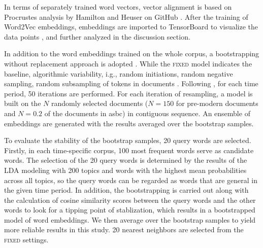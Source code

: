 In terms of separately trained word vectors, vector alignment is based on Procrustes analysis by Hamilton and Heuser on GitHub \parencite{hamilton2016law}. After the training of Word2Vec embeddings, embeddings are imported to TensorBoard to visualize the data points \parencite{smilkov2016projector}, and further analyzed in the discussion section.

In addition to the word embeddings trained on the whole corpus, a bootstrapping without replacement approach is adopted \parencite{antoniak2018evaluating}. While the \textsc{fixed} model indicates the baseline, algorithmic variability, i.g., random initiations, random negative sampling, random subsampling of tokens in documents \parencite{antoniak2018evaluating}. Following \textcite{antoniak2018evaluating}, for each time period, 50 iterations are performed. For each iteration of resampling, a model is built on the $N$ randomly selected documents ($N=150$ for pre-modern documents and $N=0.2$ of the documents in \gls{asbc}) in contiguous sequence. An ensemble of embeddings are generated with the results averaged over the bootstrap samples.

To evaluate the stability of the bootstrap samples, 20 query words are selected. Firstly, in each time-specific corpus, 100 most frequent words serve as candidate words. The selection of the 20 query words is determined by the results of the LDA modeling with 200 topics and words with the highest mean probabilities across all topics, so the query words can be regarded as words that are general in the given time period. In addition, the bootstrapping is carried out along with the calculation of cosine similarity scores between the query words and the other words to look for a tipping point of stablization, which results in a bootstrapped model of word embeddings. We then average over the bootstrap samples to yield more reliable results in this study. 20 nearest neighbors are selected from the \textsc{fixed} settings. 


